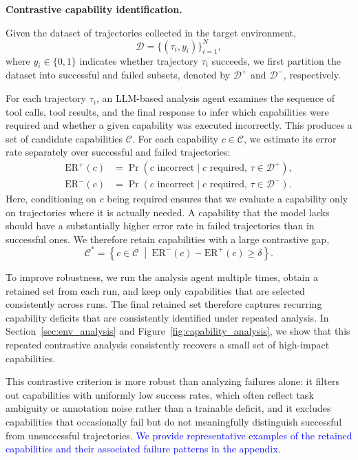 \noindent\textbf{Contrastive capability identification.}

Given the dataset of trajectories collected in the target environment,
\[
\mathcal{D} = \{(\tau_i, y_i)\}_{i=1}^N,
\]
where $y_i \in \{0,1\}$ indicates whether trajectory $\tau_i$ succeeds, we first partition the dataset into successful and failed subsets, denoted by $\mathcal{D}^{+}$ and $\mathcal{D}^{-}$, respectively.

For each trajectory $\tau_i$, an LLM-based analysis agent examines the sequence of tool calls, tool results, and the final response to infer which capabilities were required and whether a given capability was executed incorrectly. This produces a set of candidate capabilities $\mathcal{C}$. For each capability $c \in \mathcal{C}$, we estimate its error rate separately over successful and failed trajectories:
\begin{equation}
\begin{aligned}
\mathrm{ER}^{+}(c)
&= \Pr(c\text{ incorrect} \mid c\text{ required},\, \tau \in \mathcal{D}^{+}), \\
\mathrm{ER}^{-}(c)
&= \Pr(c\text{ incorrect} \mid c\text{ required},\, \tau \in \mathcal{D}^{-}).
\end{aligned}
\end{equation}
Here, conditioning on $c$ being required ensures that we evaluate a capability only on trajectories where it is actually needed. A capability that the model lacks should have a substantially higher error rate in failed trajectories than in successful ones. We therefore retain capabilities with a large contrastive gap,
\[
\mathcal{C}^{*}
=
\left\{
c \in \mathcal{C}
\;\middle|\;
\mathrm{ER}^{-}(c) - \mathrm{ER}^{+}(c) \ge \delta
\right\}.
\]

To improve robustness, we run the analysis agent multiple times, obtain a retained set from each run, and keep only capabilities that are selected consistently across runs. The final retained set therefore captures recurring capability deficits that are consistently identified under repeated analysis. In Section~\ref{sec:env_analysis} and Figure~\ref{fig:capability_analysis}, we show that this repeated contrastive analysis consistently recovers a small set of high-impact capabilities.

This contrastive criterion is more robust than analyzing failures alone: it filters out capabilities with uniformly low success rates, which often reflect task ambiguity or annotation noise rather than a trainable deficit, and it excludes capabilities that occasionally fail but do not meaningfully distinguish successful from unsuccessful trajectories. \textcolor{blue}{We provide representative examples of the retained capabilities and their associated failure patterns in the appendix.}


